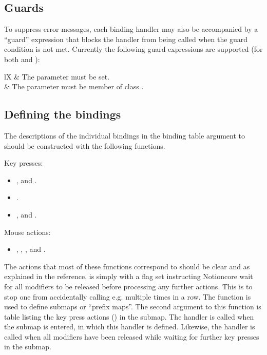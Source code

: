 \subsection{Guards}

To suppress error messages, each binding handler may also be accompanied
by a ``guard'' expression that blocks the handler from being called when
the guard condition is not met. Currently the following guard expressions
are supported (for both  and ):

\begin{tabularx}{\linewidth}{lX}
     & The  parameter must be set. \\
     & The  parameter must be member
      of class . \\
\end{tabularx}


\subsection{Defining the bindings}
\label{sec:binddef}

The descriptions of the individual bindings in the binding table argument
to  should be constructed with the following
functions.

Key presses:
\begin{itemize}
    \item {}, and
          .
    \item {}.
    \item {}, and
          .
\end{itemize}
Mouse actions:
\begin{itemize}
    \item {},
          ,
          , and
          .
\end{itemize}

The actions that most of these functions correspond to should be clear
and as explained in the reference,  is simply
 with a flag set instructing Notioncore wait for
all modifiers to be released before processing any further actions.
This is to stop one from accidentally calling e.g.
 multiple times in a row. The 
 function is used to define submaps or
``prefix maps''. The second argument to this function is table listing
the key press actions () in the submap. 
The  handler is called when the submap
is entered, in which this handler is defined. Likewise, the
 handler is  called when all modifiers
have been released while waiting for further key presses in the submap.


